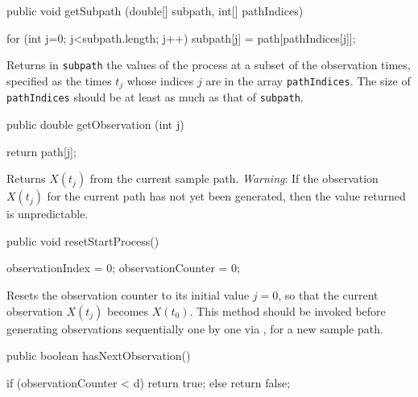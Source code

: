 \begin{code}

   public void getSubpath (double[] subpath, int[] pathIndices) \begin{hide} {
        for (int j=0; j<subpath.length; j++) {
            subpath[j] = path[pathIndices[j]];
        }
    }\end{hide}
\end{code}
\begin{tabb}
Returns in \texttt{subpath} the values of the process at a subset of the observation times,
specified as the times $t_{j}$ whose indices $j$ are in the array \texttt{pathIndices}.
The size of \texttt{pathIndices} should be at least as much as that of \texttt{subpath}.
\end{tabb}
\begin{code}

   public double getObservation (int j) \begin{hide} {
        return path[j];
    }\end{hide}
\end{code}
\begin{tabb} Returns $X(t_{j})$ from the current sample path.
\emph{Warning}: If the observation $X(t_{j})$ for the current path has not yet been
generated, then %
the value returned is unpredictable.
\end{tabb}
\begin{code}

   public void resetStartProcess() \begin{hide} {
        observationIndex   = 0;
        observationCounter = 0;
    }\end{hide}
\end{code}
\begin{tabb} Resets the observation counter to its initial value $j=0$, so
that the current observation $X(t_{j})$ becomes $X(t_{0})$. This method should
 be invoked before generating observations sequentially one by one
via , for a new sample path.
\end{tabb}
\begin{code}

   public boolean hasNextObservation() \begin{hide} {
        if (observationCounter < d) return true;
        else return false;
    }\end{hide}
\end{code}
